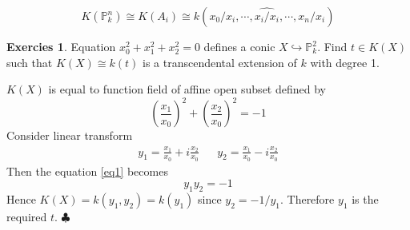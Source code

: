 \documentclass[12pt,a4paper]{article}
\theoremstyle{definition}
\newtheorem{exer}{Exercies}[section]
\newcommand*{\qeds}{\hfill\ensuremath{\clubsuit}}
\begin{document}
\[
K(\mathbb{P}^n_k) \cong K(A_i) \cong k(x_0/x_i, \cdots, \widehat{x_i/x_i},\cdots, x_n/x_i)
\]
\begin{exer}
	Equation $x_0^2 + x_1^2 + x_2^2=0$ defines a conic $X \hookrightarrow \mathbb{P}_k^2$. Find $t \in K(X)$ such that $K(X) \cong k(t)$ is a transcendental extension of $k$ with degree 1.
\end{exer}
$K(X)$ is equal to function field of affine open subset defined by
\begin{equation}
\label{eq1}
	(\frac{x_1}{x_0})^2 + (\frac{x_2}{x_0})^2 = -1
\end{equation}
Consider linear transform
\begin{align}
y_1 = \frac{x_1}{x_0} + i \frac{x_2}{x_0}& &
y_2 = \frac{x_1}{x_0} - i \frac{x_2}{x_0}
\end{align}
Then the equation \ref{eq1} becomes
\begin{equation}
	y_1 y_2 =-1
\end{equation}
Hence $K(X) = k(y_1,y_2) = k(y_1)$ since $y_2 =-1/y_1$. Therefore $y_1$ is the required $t$. \qeds
\end{document}
